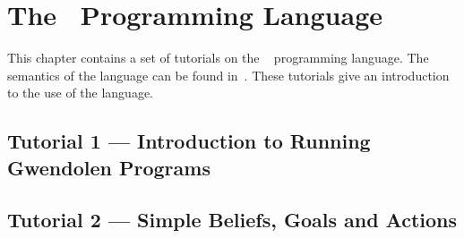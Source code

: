 %
\chapter{The \gwendolen\ Programming Language}

This chapter contains a set of tutorials on the \gwendolen\  programming language.  The semantics of the language can be found in~\cite{dennis17gwen}.  These tutorials give an introduction to the use of the language.

\section{Tutorial 1 --- Introduction to Running Gwendolen Programs}

{
  \let\section\subsection
  \let\subsection\subsubsection
  \let\subsubsection\paragraph
  
  
  }

\section{Tutorial 2 --- Simple Beliefs, Goals and Actions}

